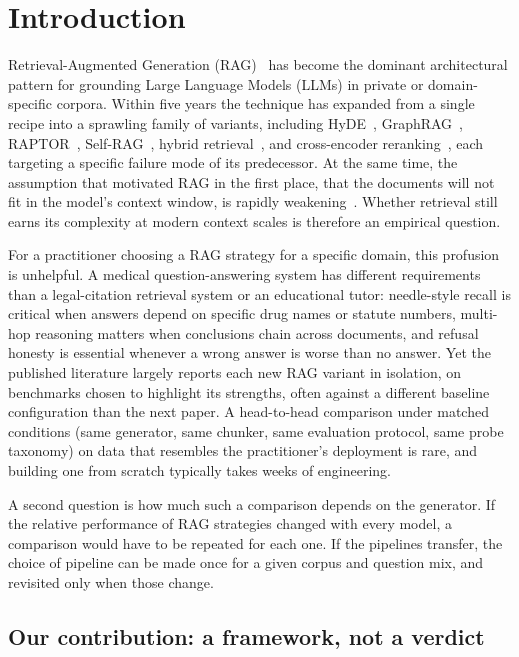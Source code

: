 \documentclass[conference,a4paper,10pt]{IEEEtran}
\begin{document}
\section{Introduction}
\label{sec:intro}

Retrieval-Augmented Generation (RAG)~\cite{lewis2020rag,karpukhin2020dpr} has become the dominant architectural pattern for grounding Large Language Models (LLMs) in private or domain-specific corpora.
Within five years the technique has expanded from a single recipe into a sprawling family of variants, including HyDE~\cite{gao2023hyde}, GraphRAG~\cite{edge2024graphrag}, RAPTOR~\cite{sarthi2024raptor}, Self-RAG~\cite{asai2024selfrag}, hybrid retrieval~\cite{cormack2009rrf}, and cross-encoder reranking~\cite{khattab2020colbert,xiao2023cpack}, each targeting a specific failure mode of its predecessor.
At the same time, the assumption that motivated RAG in the first place, that the documents will not fit in the model's context window, is rapidly weakening~\cite{gemini2024}. Whether retrieval still earns its complexity at modern context scales is therefore an empirical question.

For a practitioner choosing a RAG strategy for a specific domain, this profusion is unhelpful.
A medical question-answering system has different requirements than a legal-citation retrieval system or an educational tutor: needle-style recall is critical when answers depend on specific drug names or statute numbers, multi-hop reasoning matters when conclusions chain across documents, and refusal honesty is essential whenever a wrong answer is worse than no answer.
Yet the published literature largely reports each new RAG variant in isolation, on benchmarks chosen to highlight its strengths, often against a different baseline configuration than the next paper.
A head-to-head comparison under matched conditions (same generator, same chunker, same evaluation protocol, same probe taxonomy) on data that resembles the practitioner's deployment is rare, and building one from scratch typically takes weeks of engineering.

A second question is how much such a comparison depends on the generator.
If the relative performance of RAG strategies changed with every model, a comparison would have to be repeated for each one.
If the pipelines transfer, the choice of pipeline can be made once for a given corpus and question mix, and revisited only when those change.

\subsection{Our contribution: a framework, not a verdict}
\end{document}
